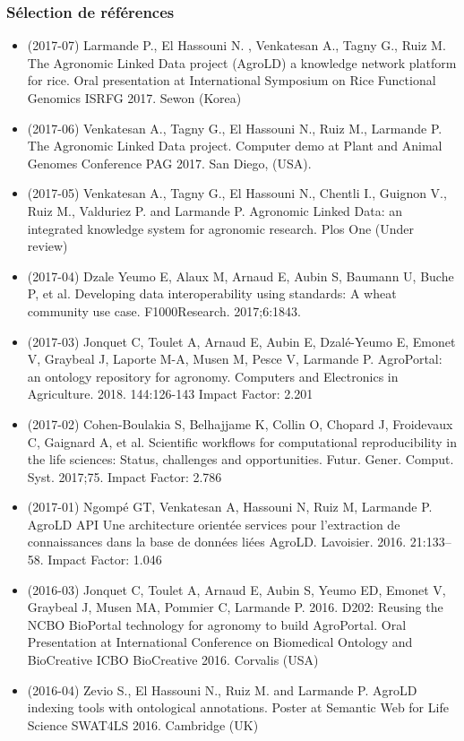 \subsubsection*{Sélection de références} 
\begin{itemize}

\item (2017-07) Larmande P., El Hassouni N. , Venkatesan A., Tagny G., Ruiz M. The Agronomic Linked Data project (AgroLD) a knowledge network platform for rice. Oral presentation at International Symposium on Rice Functional Genomics ISRFG 2017. Sewon (Korea)
\item (2017-06) Venkatesan A., Tagny G., El Hassouni N., Ruiz M., Larmande P. The Agronomic Linked Data project. Computer demo at Plant and Animal Genomes Conference PAG 2017. San Diego, (USA).
\item  (2017-05) Venkatesan A., Tagny G., El Hassouni N., Chentli I., Guignon V., Ruiz M., Valduriez P. and Larmande P. Agronomic Linked Data: an integrated knowledge system for agronomic research. Plos One (Under review)
\item (2017-04) Dzale Yeumo E, Alaux M, Arnaud E, Aubin S, Baumann U, Buche P, et al. Developing data interoperability using standards: A wheat community use case. F1000Research. 2017;6:1843.
\item (2017-03) Jonquet C, Toulet A, Arnaud E, Aubin E, Dzalé-Yeumo E, Emonet V, Graybeal J, Laporte M-A, Musen M, Pesce V, Larmande P. AgroPortal: an ontology repository for agronomy. Computers and Electronics in Agriculture. 2018. 144:126-143 Impact Factor: 2.201
\item (2017-02) Cohen-Boulakia S, Belhajjame K, Collin O, Chopard J, Froidevaux C, Gaignard A, et al. Scientific workflows for computational reproducibility in the life sciences: Status, challenges and opportunities. Futur. Gener. Comput. Syst. 2017;75. Impact Factor: 2.786
\item (2017-01) Ngompé GT, Venkatesan A, Hassouni N, Ruiz M, Larmande P. AgroLD API Une architecture orientée services pour l’extraction de connaissances dans la base de données liées AgroLD. Lavoisier. 2016. 21:133–58. Impact Factor: 1.046
\item (2016-03) Jonquet C, Toulet A, Arnaud E, Aubin S, Yeumo ED, Emonet V, Graybeal J, Musen MA, Pommier C, Larmande P.  2016.  D202: Reusing the NCBO BioPortal technology for agronomy to build AgroPortal. Oral Presentation at International Conference on Biomedical Ontology and BioCreative ICBO BioCreative 2016. Corvalis (USA)
\item (2016-04) Zevio S., El Hassouni N., Ruiz M. and Larmande P. AgroLD indexing tools with ontological annotations. Poster at Semantic Web for Life Science SWAT4LS 2016. Cambridge (UK)

\end{itemize}
